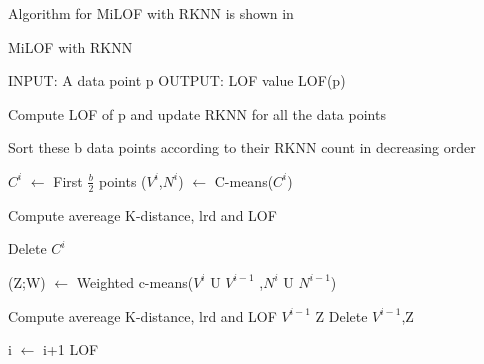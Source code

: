 Algorithm for MiLOF with RKNN is shown in 

\begin{algorithm}[h!]
	\caption{MiLOF with RKNN}
	\begin{algorithmic}
		\STATE  
		\STATE INPUT:  A data point p 
		\STATE OUTPUT: LOF value LOF(p)
		\STATE
		
		\STATE Compute LOF of p and update RKNN for all the data points 
		
		\STATE Sort these b data points according to their RKNN count in decreasing order
		
		\STATE $C^i$ $\leftarrow$ First $\frac{b}{2}$ points
		\STATE ($V^i$,$N^i$) $\leftarrow$ C-means($C^i$)
		
		\STATE Compute avereage K-distance, lrd and LOF
		\ENDFOR
		
		\STATE Delete $C^i$
		
		\STATE (Z;W) $\leftarrow$ Weighted c-means($V^i$ U $V^{i-1}$ ,$N^i$ U $N^{i-1}$)
		
		\STATE Compute avereage K-distance, lrd and LOF
		\ENDFOR 
		\STATE $V^{i-1}$ \leftarrow Z
		\STATE Delete $V^{i-1}$,Z
		
		\ENDIF	
		\ENDIF
		
		\STATE i $\leftarrow$ i+1
		\RETURN LOF
	\end{algorithmic}
\end{algorithm}











